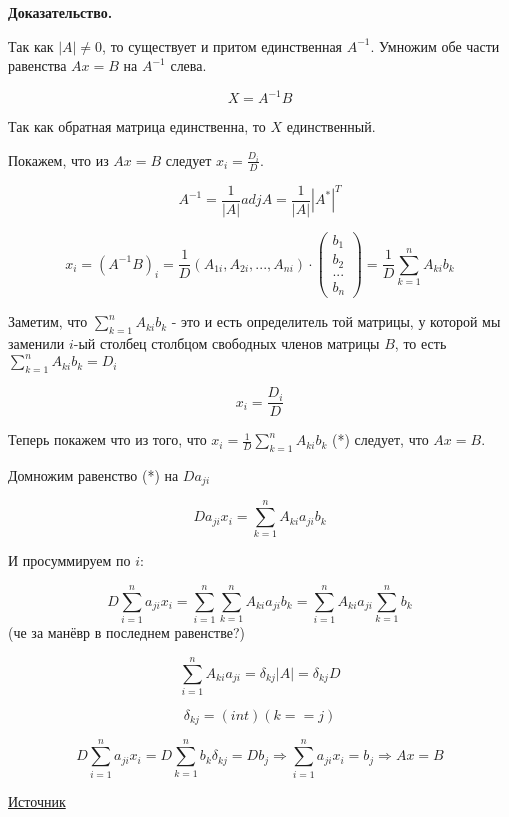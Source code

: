 \documentclass[a4paper]{article}
\begin{document}
\begin{hproof}\textbf{Доказательство.}

Так как $|A| \neq 0$, то существует и притом единственная $A^{-1}$. Умножим обе части равенства $Ax = B$ на $A^{-1}$ слева.

\[ X = A^{-1}B \]

Так как обратная матрица единственна, то $X$ единственный.

Покажем, что из $Ax = B$ следует $x_i = \frac{D_i}{D}$.

\[ A^{-1} = \frac{1}{|A|} adj A = \frac{1}{|A|} |A^*|^T \]

\[ x_i = (A^{-1}B)_i = \frac{1}{D} (A_{1i}, A_{2i}, ..., A_{ni}) \cdot \begin{pmatrix}
b_1 \\ b_2 \\ ... \\ b_n
\end{pmatrix} = \frac{1}{D} \sum_{k=1}^n A_{ki} b_k \]

Заметим, что $\sum_{k=1}^n A_{ki} b_k$ - это и есть определитель той матрицы, у которой мы заменили $i$-ый столбец столбцом свободных членов матрицы $B$, то есть $\sum_{k=1}^n A_{ki} b_k = D_i$

\[ x_i = \frac{D_i}{D} \]

Теперь покажем что из того, что $x_i = \frac{1}{D} \sum_{k=1}^n A_{ki} b_k$ (*) следует, что $Ax=B$.

Домножим равенство (*) на $Da_{ji}$

\[ D a_{ji} x_i = \sum_{k=1}^n A_{ki} a_{ji} b_k \]

И просуммируем по $i$:

\[ D \sum_{i=1}^n a_{ji} x_i = \sum_{i=1}^n  \sum_{k=1}^n A_{ki} a_{ji} b_k  = \sum_{i=1}^n A_{ki} a_{ji}  \sum_{k=1}^n b_k \] (че за манёвр в последнем равенстве?)

\[ \sum_{i=1}^n A_{ki} a_{ji} = \delta_{kj} |A| = \delta_{kj} D \]

\[ \delta_{kj} = (int)(k==j) \]

\[D \sum_{i=1}^n a_{ji} x_i = D \sum_{k=1}^n b_k \delta_{kj} = Db_j \Rightarrow \sum_{i=1}^n a_{ji}x_i = b_j \Rightarrow Ax=B \]

\href{https://portal.tpu.ru/SHARED/k/KONVAL/Sites/Russian_sites/2/18.htm}{Источник}
\end{hproof}
\end{document}
